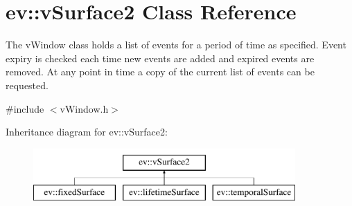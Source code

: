 \hypertarget{classev_1_1vSurface2}{}\section{ev\+:\+:v\+Surface2 Class Reference}
\label{classev_1_1vSurface2}


The v\+Window class holds a list of events for a period of time as specified. Event expiry is checked each time new events are added and expired events are removed. At any point in time a copy of the current list of events can be requested.  




{\ttfamily \#include $<$v\+Window.\+h$>$}

Inheritance diagram for ev\+:\+:v\+Surface2\+:\begin{figure}[H]
\begin{center}
\leavevmode
\includegraphics[height=2.000000cm]{classev_1_1vSurface2}
\end{center}
\end{figure}
